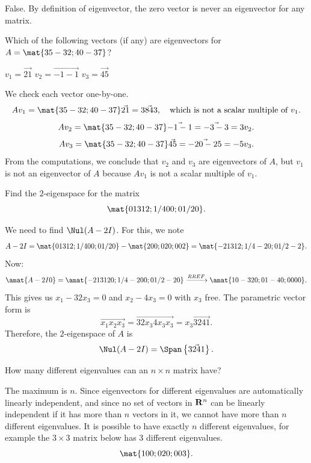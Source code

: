 \begin{problems}
\begin{solution}
  False.  By definition of eigenvector, the zero vector is never an eigenvector
  for any matrix.
\end{solution}

\problem %
Which of the following vectors (if any) are eigenvectors for
$A = \mat{35 -32; 40 -37}$?
\begin{subproblems}
  \subproblem  $v_1 = \vec{2 1}$  %
  \subproblem  $v_2 = \vec{-1 -1}$%
  \subproblem  $v_3 = \vec{4 5}$ %
\end{subproblems}

\begin{solution}
We check each vector one-by-one.
\[Av_1 = \mat{35 -32; 40 -37} \vec{2 1} = \vec{38 43}, %
  \quad \textup{which is not a scalar multiple of } v_1.\]
\[Av_2 = \mat{35 -32; 40 -37} \vec{-1 -1} = \vec{-3 -3} = 3v_2.\]
\[Av_3 = \mat{35 -32; 40 -37} \vec{4 5} = \vec{-20 -25} = -5v_3.\] From the
computations, we conclude that $v_2$ and $v_3$ are eigenvectors of $A$, but $v_1$
is not an eigenvector of $A$ because $Av_1$ is not a scalar multiple of $v_1$.
\end{solution}


\problem %
Find the $2$-eigenspace for the matrix
\[\mat{0 13 12; 1/4 0 0; 0 1/2 0}.\]
\begin{solution}
We need to find $\Nul(A-2I)$.  For this, we note
\[A - 2I = \mat{0 13 12; 1/4 0 0; 0 1/2 0} - \mat{2 0 0; 0 2 0; 0 0 2}
= \mat{-2 13 12; 1/4 -2 0; 0 1/2 -2}.\]
Now:
\[\amat{A-2I 0} =
  \amat{-2 13 12 0; 1/4 -2 0 0; 0 1/2 -2 0}
  \xrightarrow[]{RREF}
  \amat{1 0 -32 0; 0 1 -4 0; 0 0 0 0}.\]
This gives us $x_1 - 32x_3 = 0$ and $x_2 - 4 x_3 = 0$ with $x_3$ free.  The parametric
vector form is 
\[\vec{x_1 x_2 x_3} = \vec{32x_3 4x_3 x_3} = x_3 \vec{32 4 1}.\]
Therefore, the $2$-eigenspace of $A$ is
\[\Nul(A-2I) = \Span \left\{\vec{32 4 1}\right\}.\]
\end{solution}

\problem %
How many different eigenvalues can an $n \times n$ matrix have?

\begin{solution}
  The maximum is $n$.  Since eigenvectors for different eigenvalues are
  automatically linearly independent, and since no set of vectors in
  ${\bf R}^{n}$ can be linearly independent if it has more than $n$ vectors in
  it, we cannot have more than $n$ different eigenvalues.  It is possible to
  have exactly $n$ different eigenvalues, for example the $3 \times 3$ matrix
  below has $3$ different eigenvalues.
  \[\mat{1 0 0; 0 2 0; 0 0 3}.\]
\end{solution}


\end{problems}
